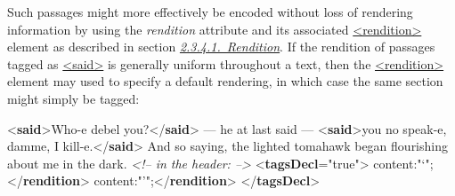 Such passages might more effectively be encoded without loss of rendering information by using the {\itshape rendition} attribute and its associated \hyperref[TEI.rendition]{<rendition>} element as described in section \textit{\hyperref[HD57-1]{2.3.4.1.\ Rendition}}. If the rendition of passages tagged as \hyperref[TEI.said]{<said>} is generally uniform throughout a text, then the \hyperref[TEI.rendition]{<rendition>} element may used to specify a default rendering, in which case the same section might simply be tagged: \par\bgroup{}\exampleFont \begin{shaded}\noindent\mbox{}{<\textbf{said}>}Who-e debel\mbox{}\newline 
 you?{</\textbf{said}>} — he at last said —\mbox{}\newline 
{<\textbf{said}>}you no speak-e,\mbox{}\newline 
 damme, I kill-e.{</\textbf{said}>} And so saying,\mbox{}\newline 
 the lighted tomahawk began flourishing\mbox{}\newline 
 about me in the dark.\mbox{}\newline 
\mbox{}\newline 
\textit{<!-- in the header: -->}\mbox{}\newline 
{<\textbf{tagsDecl}\hspace*{1em}{partial}="{true}">}\mbox{}\newline 
{}content:"‘";{</\textbf{rendition}>}\mbox{}\newline 
{}content:"’";{</\textbf{rendition}>}\mbox{}\newline 
{</\textbf{tagsDecl}>}\end{shaded}\egroup\par \par
